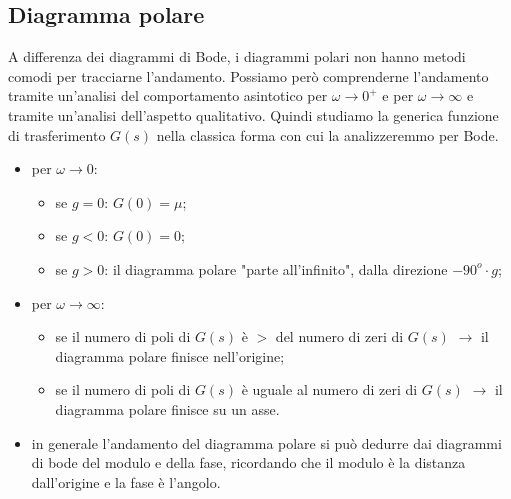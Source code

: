 \begin{landscape}
\begin{multicols*}{3}
    \section{Diagramma polare}
    A differenza dei diagrammi di Bode, i diagrammi polari non hanno metodi comodi per tracciarne l'andamento. Possiamo però comprenderne l'andamento tramite un'analisi del comportamento asintotico per $\omega \rightarrow 0^+$ e per $\omega \rightarrow  \infty$ e tramite un'analisi dell'aspetto qualitativo.\newline
    \newline
    Quindi studiamo la generica funzione di trasferimento $G(s)$ nella classica forma con cui la analizzeremmo per Bode.
    \begin{itemize}
        \item per $\omega \rightarrow  0$:
        \begin{itemize}
            \item se $g=0$: $G(0) = \mu$;
            \item se $g<0$: $G(0) = 0$;
            \item se $g>0$: il diagramma polare "parte all'infinito", dalla direzione $-90^o \cdot  g$;
        \end{itemize}
        \item per $\omega \rightarrow  \infty$:
        \begin{itemize}
            \item se il numero di poli di $G(s)$ è $>$ del numero di zeri di $G(s)$ $\rightarrow $ il diagramma polare finisce nell'origine;
            \item se il numero di poli di $G(s)$ è uguale al numero di zeri di $G(s)$ $\rightarrow $ il diagramma polare finisce su un asse.
        \end{itemize}
        \item in generale l'andamento del diagramma polare si può dedurre dai diagrammi di bode del modulo e della fase, ricordando che il modulo è la distanza dall'origine e la fase è l'angolo.
    \end{itemize}

\end{multicols*}
\end{landscape}
